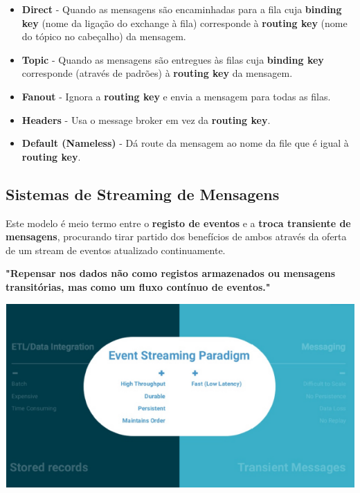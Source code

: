 \documentclass{article}
\begin{document}
\begin{itemize}
  \item \textbf{Direct} - Quando as mensagens são encaminhadas para a fila cuja \textbf{binding key} (nome da ligação do
  exchange à fila) corresponde à \textbf{routing key} (nome do tópico no cabeçalho) da mensagem.
  \item \textbf{Topic} - Quando as mensagens são entregues às filas cuja \textbf{binding key} corresponde (através de padrões) à
  \textbf{routing key} da mensagem.
  \item \textbf{Fanout} - Ignora a \textbf{routing key} e envia a mensagem para todas as filas.
  \item \textbf{Headers} - Usa o message broker em vez da \textbf{routing key}.
  \item \textbf{Default (Nameless)} - Dá route da mensagem ao nome
  da file que é igual à \textbf{routing key}.
\end{itemize}

\subsection{Sistemas de Streaming de Mensagens}

Este modelo é meio termo entre o \textbf{registo de eventos} e a \textbf{troca transiente de mensagens},
procurando tirar partido dos benefícios de ambos através da oferta de um stream de eventos
atualizado continuamente.

\vspace{2mm}

\textbf{"Repensar nos dados não como registos armazenados ou
mensagens transitórias, mas como um fluxo contínuo de eventos."}

\begin{center}
  \includegraphics[scale=0.6]{111}
\end{center}
\end{document}
